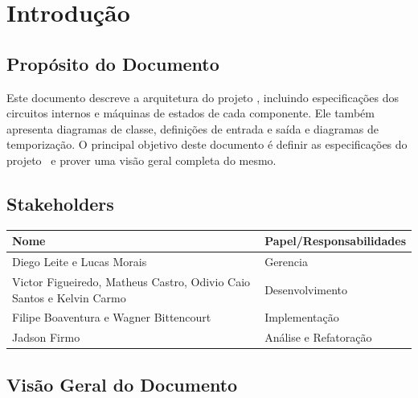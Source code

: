 \documentclass{report}
\begin{document}
\tableofcontents

\chapter{Introdução}
  
  \section{Propósito do Documento}
  Este documento descreve a arquitetura do projeto \ipPROCESSProject, incluindo especificações dos circuitos internos e máquinas de estados de cada componente. Ele também apresenta diagramas de classe, definições de entrada e saída e diagramas de temporização. O principal objetivo deste documento é definir as especificações do projeto \ipPROCESSProject\ e prover uma visão geral completa do mesmo.
  
  \section{Stakeholders}
    \FloatBarrier
    \begin{table}[H] 
      \begin{center}
        \begin{tabular}[pos]{|m{6cm} | m{8cm}|} 
          \hline 
          \cellcolor[gray]{0.9}\textbf{Nome} & \cellcolor[gray]{0.9}\textbf{Papel/Responsabilidades} \\ \hline
          Diego Leite e Lucas Morais & Gerencia  \\ \hline
           Victor Figueiredo, Matheus Castro, Odivio Caio Santos e Kelvin Carmo & Desenvolvimento  \\ \hline
           Filipe Boaventura e Wagner Bittencourt & Implementação  \\ \hline
           Jadson Firmo & Análise e Refatoração  \\ \hline
        \end{tabular}
      \end{center}
    \end{table} 

\section{Visão Geral do Documento}
\end{document}
